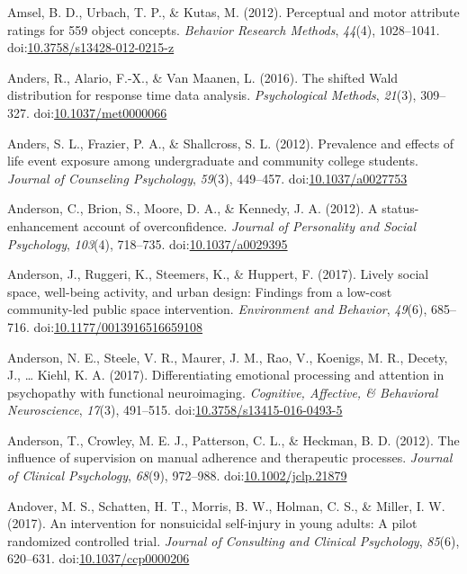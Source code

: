 \documentclass[english,man]{apa6}
\theoremstyle{definition}
\theoremstyle{definition}
\theoremstyle{definition}
\theoremstyle{remark}
\begin{document}
\hypertarget{ref-Amsel2012}{}
Amsel, B. D., Urbach, T. P., \& Kutas, M. (2012). Perceptual and motor
attribute ratings for 559 object concepts. \emph{Behavior Research
Methods}, \emph{44}(4), 1028--1041.
doi:\href{https://doi.org/10.3758/s13428-012-0215-z}{10.3758/s13428-012-0215-z}

\hypertarget{ref-Anders2016}{}
Anders, R., Alario, F.-X., \& Van Maanen, L. (2016). The shifted Wald
distribution for response time data analysis. \emph{Psychological
Methods}, \emph{21}(3), 309--327.
doi:\href{https://doi.org/10.1037/met0000066}{10.1037/met0000066}

\hypertarget{ref-Anders2012}{}
Anders, S. L., Frazier, P. A., \& Shallcross, S. L. (2012). Prevalence
and effects of life event exposure among undergraduate and community
college students. \emph{Journal of Counseling Psychology}, \emph{59}(3),
449--457. doi:\href{https://doi.org/10.1037/a0027753}{10.1037/a0027753}

\hypertarget{ref-Anderson2012a}{}
Anderson, C., Brion, S., Moore, D. A., \& Kennedy, J. A. (2012). A
status-enhancement account of overconfidence. \emph{Journal of
Personality and Social Psychology}, \emph{103}(4), 718--735.
doi:\href{https://doi.org/10.1037/a0029395}{10.1037/a0029395}

\hypertarget{ref-Anderson2017}{}
Anderson, J., Ruggeri, K., Steemers, K., \& Huppert, F. (2017). Lively
social space, well-being activity, and urban design: Findings from a
low-cost community-led public space intervention. \emph{Environment and
Behavior}, \emph{49}(6), 685--716.
doi:\href{https://doi.org/10.1177/0013916516659108}{10.1177/0013916516659108}

\hypertarget{ref-Anderson2017a}{}
Anderson, N. E., Steele, V. R., Maurer, J. M., Rao, V., Koenigs, M. R.,
Decety, J., \ldots{} Kiehl, K. A. (2017). Differentiating emotional
processing and attention in psychopathy with functional neuroimaging.
\emph{Cognitive, Affective, \& Behavioral Neuroscience}, \emph{17}(3),
491--515.
doi:\href{https://doi.org/10.3758/s13415-016-0493-5}{10.3758/s13415-016-0493-5}

\hypertarget{ref-Anderson2012}{}
Anderson, T., Crowley, M. E. J., Patterson, C. L., \& Heckman, B. D.
(2012). The influence of supervision on manual adherence and therapeutic
processes. \emph{Journal of Clinical Psychology}, \emph{68}(9),
972--988.
doi:\href{https://doi.org/10.1002/jclp.21879}{10.1002/jclp.21879}

\hypertarget{ref-Andover2017}{}
Andover, M. S., Schatten, H. T., Morris, B. W., Holman, C. S., \&
Miller, I. W. (2017). An intervention for nonsuicidal self-injury in
young adults: A pilot randomized controlled trial. \emph{Journal of
Consulting and Clinical Psychology}, \emph{85}(6), 620--631.
doi:\href{https://doi.org/10.1037/ccp0000206}{10.1037/ccp0000206}
\end{document}
